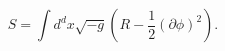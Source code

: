 \begin{equation}
S=\int d^d x \sqrt {-g} \left(R-\frac{1}{2}(\partial \phi)^2\right).
\label{eff}
\end{equation}

